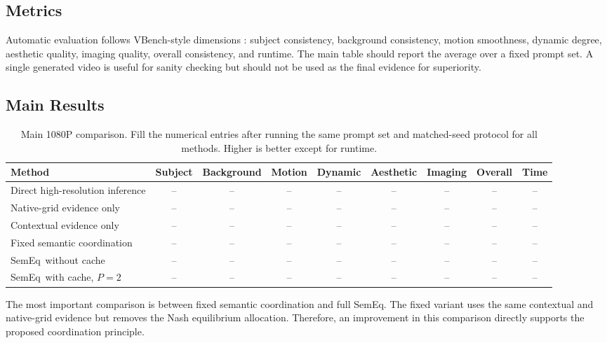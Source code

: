 \documentclass[10pt,twocolumn]{article}
\newcommand{\method}{SemEq}
\newcommand{\pending}{--}
\begin{document}
\subsection{Metrics}

Automatic evaluation follows VBench-style dimensions \cite{huang2024vbench}: subject consistency, background consistency, motion smoothness, dynamic degree, aesthetic quality, imaging quality, overall consistency, and runtime. The main table should report the average over a fixed prompt set. A single generated video is useful for sanity checking but should not be used as the final evidence for superiority.

\subsection{Main Results}

\begin{table}[t]
\centering
\caption{Main 1080P comparison. Fill the numerical entries after running the same prompt set and matched-seed protocol for all methods. Higher is better except for runtime.}
\label{tab:main}
\begin{tabular}{lcccccccc}
\toprule
Method & Subject & Background & Motion & Dynamic & Aesthetic & Imaging & Overall & Time \\
\midrule
Direct high-resolution inference & \pending & \pending & \pending & \pending & \pending & \pending & \pending & \pending \\
Native-grid evidence only & \pending & \pending & \pending & \pending & \pending & \pending & \pending & \pending \\
Contextual evidence only & \pending & \pending & \pending & \pending & \pending & \pending & \pending & \pending \\
Fixed semantic coordination & \pending & \pending & \pending & \pending & \pending & \pending & \pending & \pending \\
\method\ without cache & \pending & \pending & \pending & \pending & \pending & \pending & \pending & \pending \\
\method\ with cache, $P=2$ & \pending & \pending & \pending & \pending & \pending & \pending & \pending & \pending \\
\bottomrule
\end{tabular}
\end{table}

The most important comparison is between fixed semantic coordination and full \method. The fixed variant uses the same contextual and native-grid evidence but removes the Nash equilibrium allocation. Therefore, an improvement in this comparison directly supports the proposed coordination principle.
\end{document}
